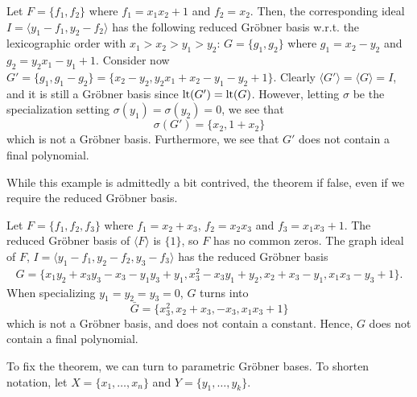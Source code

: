 \begin{example}\upshape
  Let $F = \{f_{1}, f_{2}\}$ where $f_{1} = x_{1} x_{2} + 1$ and $f_{2} = x_{2}$. Then, the corresponding ideal
  $I = \langle y_{1} - f_{1}, y_{2} - f_{2} \rangle$ has the following reduced Gröbner basis w.r.t. the lexicographic order with $x_{1} > x_{2} > y_{1} > y_{2}$: $G =  \{g_{1}, g_{2}\}$ where $g_{1} = x_{2} - y_{2}$ and $ g_{2} = y_{2}x_{1} - y_{1} + 1$. Consider now $G' = \{g_{1}, g_{1} - g_{2}\} = \{x_{2} - y_{2}, y_{2}x_{1} + x_{2} - y_{1} - y_{2} + 1\}$. Clearly $\langle G' \rangle = \langle G \rangle = I$, and it is still a Gröbner basis since $\operatorname{lt}(G') = \operatorname{lt}(G)$. However, letting $\sigma$ be the specialization setting $\sigma(y_{1}) = \sigma(y_{2}) = 0$, we see that
  \[\sigma(G') = \{x_{2}, 1+x_{2}\}\]
  which is not a Gröbner basis. Furthermore, we see that $G'$ does not contain a final polynomial.
\end{example}

While this example is admittedly a bit contrived, the theorem if false, even if we require the reduced Gröbner basis.

\begin{example}\upshape
    Let $F = \{f_1, f_2, f_3\}$ where $f_1 = x_2 + x_3$, $f_2 = x_2 x_3$ and $f_3 = x_1 x_3 + 1$. The reduced Gröbner basis of $\langle F \rangle$ is $\{1\}$, so $F$ has no common zeros. The graph ideal of $F$, $I = \langle y_1 - f_1, y_2 - f_2, y_3 - f_3 \rangle$ has the reduced Gröbner basis
    \begin{gather*}
    G = \{ x_1 y_2 + x_3 y_3 - x_3 - y_1 y_3 + y_1, x_3^2 - x_3 y_1 + y_2, x_2 + x_3 - y_1, x_1 x_3 - y_3 + 1\}.
    \end{gather*}
    When specializing $y_1 = y_2 = y_3 = 0$, $G$ turns into
    \[\bar G = \{ x_3^2, x_2 + x_3, -x_3, x_1 x_3 + 1\}\]
    which is not a Gröbner basis, and does not contain a constant. Hence, $G$ does not contain a final polynomial.
\end{example}


To fix the theorem, we can turn to parametric Gröbner bases. To shorten notation, let $X = \{x_{1}, \dots, x_{n}\}$ and $Y = \{y_{1}, \dots, y_{k}\}$.

